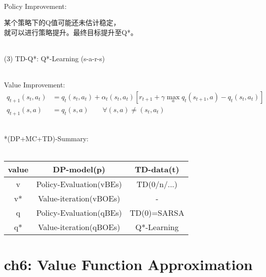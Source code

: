 \documentclass{article}
\begin{document}
~ \\[3pt]
Policy Improvement: \\[3pt]
\begin{CJK}{UTF8}{gbsn}
    某个策略下的Q值可能还未估计稳定， \\[3pt]
    就可以进行策略提升。最终目标提升至Q*。 \\[3pt]
\end{CJK}


~ \\[3pt]
(3) TD-Q*: \qquad Q*-Learning \quad (s-a-r-s) 

~ \\[3pt]
Value Improvement: 
\begin{align*}
    q_{t+1} (s_{t}, a_{t}) 
        &= q_{t} (s_{t}, a_{t}) + \alpha_{t} (s_{t}, a_{t}) 
        [ r_{t+1} + \gamma \max_{a} q_{t} (s_{t+1}, a) 
        - q_{t} (s_{t}, a_{t}) ] \\[3pt]
    q_{t+1} (s, a) &= q_{t} (s, a) 
    \qquad \forall (s, a) \neq (s_{t}, a_{t}) 
\end{align*}


~ \\[96pt]
*(DP+MC+TD)-Summary: \\[3pt]
~ \\[3pt]
\centering
\begin{tabular}{ccc}  %

    \toprule 
        value & DP-model(p)                 & TD-data(t)  \\[3pt]
    \midrule 
        v     & Policy-Evaluation(vBEs)     & TD(0/n/...) \\[3pt]
        v*    & Value-iteration(vBOEs)      & -           \\[3pt]
        q     & Policy-Evaluation(qBEs)     & TD(0)=SARSA \\[3pt]
        q*    & Value-iteration(qBOEs)      & Q*-Learning \\[3pt]
    \bottomrule 

\end{tabular}
\flushleft


\newpage
\section*{ch6: Value Function Approximation}
\end{document}

